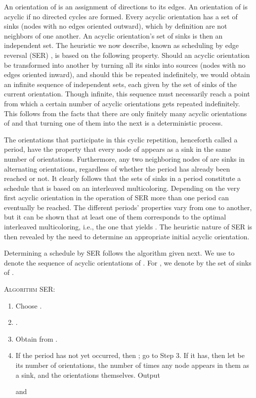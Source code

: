 \documentclass{article}
\begin{document}
An orientation of  is an assignment of directions to its edges. An
orientation of  is acyclic if no directed cycles are formed. Every acyclic
orientation has a set of sinks (nodes with no edges oriented outward), which by
definition are not neighbors of one another. An acyclic orientation's set of
sinks is then an independent set. The heuristic we now describe, known as
scheduling by edge reversal (SER) \cite{bg89,b96}, is based on the following
property. Should an acyclic orientation be transformed into another by turning
all its sinks into sources (nodes with no edges oriented inward), and should
this be repeated indefinitely, we would obtain an infinite sequence of
independent sets, each given by the set of sinks of the current orientation.
Though infinite, this sequence must necessarily reach a point from which a
certain number of acyclic orientations gets repeated indefinitely. This follows
from the facts that there are only finitely many acyclic orientations of  and
that turning one of them into the next is a deterministic process.

The orientations that participate in this cyclic repetition, henceforth called
a period, have the property that every node of  appears as a sink in the same
number of orientations. Furthermore, any two neighboring nodes of  are sinks
in alternating orientations, regardless of whether the period has already been
reached or not. It clearly follows that the sets of sinks in a period constitute
a schedule that is based on an interleaved multicoloring. Depending on the very
first acyclic orientation in the operation of SER more than one period can
eventually be reached. The different periods' properties vary from one to
another, but it can be shown that at least one of them corresponds to the
optimal interleaved multicoloring, i.e., the one that yields
 \cite{bg89}. The heuristic nature of SER is then
revealed by the need to determine an appropriate initial acyclic orientation.

Determining a schedule  by SER follows the algorithm given next. We
use  to denote the sequence of acyclic orientations of
. For , we denote by  the set of
sinks of .

\bigskip\noindent
\textsc{Algorithm} SER:
\begin{enumerate}
\item Choose .
\item .
\item Obtain  from .
\item If the period has not yet occurred, then ; go to Step 3. If it
has, then let  be its number of orientations,  the
number of times any node appears in them as a sink, and
 the orientations
themselves. Output

and

\end{enumerate}
\end{document}
